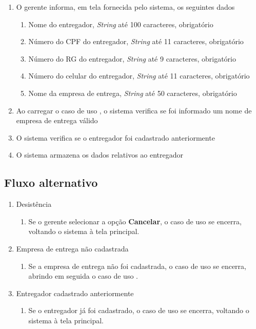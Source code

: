 \begin{enumerate}
	\item O gerente informa, em tela fornecida pelo sistema, os seguintes dados
	\begin{enumerate}
		\item Nome do entregador, \emph{String} até 100 caracteres, obrigatório
		\item Número do CPF do entregador, \emph{String} até 11 caracteres, obrigatório
		\item Número do RG do entregador, \emph{String} até 9 caracteres, obrigatório
		\item Número do celular do entregador, \emph{String} até 11 caracteres, obrigatório		
		\item Nome da empresa de entrega, \emph{String} até 50 caracteres, obrigatório
	\end{enumerate}
	\item Ao carregar o caso de uso , o sistema verifica se foi informado um nome de empresa de entrega válido
	\item O sistema verifica se o entregador foi cadastrado anteriormente
	\item O sistema armazena os dados relativos ao entregador
\end{enumerate}

\subsection{Fluxo alternativo}

\begin{enumerate}
	\item Desistência
	\begin{enumerate}
		\item Se o gerente selecionar a opção \textbf{Cancelar}, o caso de uso se encerra, voltando o
		sistema à tela principal.
	\end{enumerate}
	\item Empresa de entrega não cadastrada
	\begin{enumerate}
		\item Se a empresa de entrega não foi cadastrada, o caso de uso se encerra, abrindo em seguida o caso de uso .
	\end{enumerate}
	\item Entregador cadastrado anteriormente
	\begin{enumerate}
		\item Se o entregador já foi cadastrado, o caso de uso se encerra, voltando o
		sistema à tela principal.
	\end{enumerate}
\end{enumerate}

